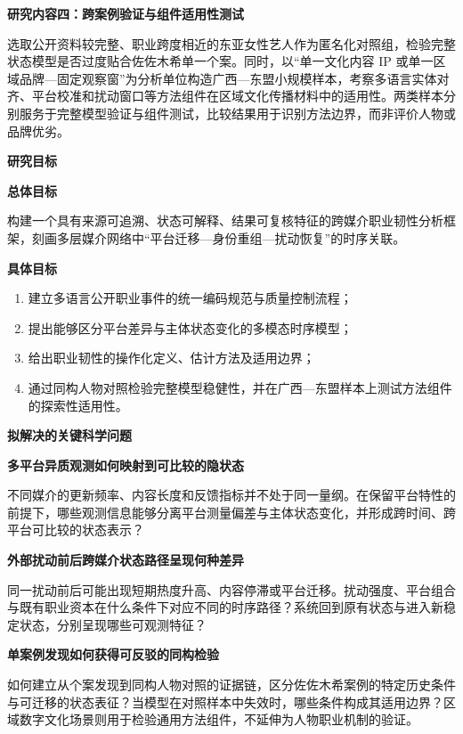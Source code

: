 \noindent\textbf{研究内容四：跨案例验证与组件适用性测试}\par
选取公开资料较完整、职业跨度相近的东亚女性艺人作为匿名化对照组，检验完整状态模型是否过度贴合佐佐木希单一个案。同时，以“单一文化内容 IP 或单一区域品牌—固定观察窗”为分析单位构造广西—东盟小规模样本，考察多语言实体对齐、平台校准和扰动窗口等方法组件在区域文化传播材料中的适用性。两类样本分别服务于完整模型验证与组件测试，比较结果用于识别方法边界，而非评价人物或品牌优劣。

\noindent\textbf{研究目标}\par

\noindent\textbf{总体目标}\par
构建一个具有来源可追溯、状态可解释、结果可复核特征的跨媒介职业韧性分析框架，刻画多层媒介网络中“平台迁移—身份重组—扰动恢复”的时序关联。

\noindent\textbf{具体目标}\par
\begin{enumerate}[label=（\arabic*）,leftmargin=*,itemsep=0pt]
  \item 建立多语言公开职业事件的统一编码规范与质量控制流程；
  \item 提出能够区分平台差异与主体状态变化的多模态时序模型；
  \item 给出职业韧性的操作化定义、估计方法及适用边界；
  \item 通过同构人物对照检验完整模型稳健性，并在广西—东盟样本上测试方法组件的探索性适用性。
\end{enumerate}

\noindent\textbf{拟解决的关键科学问题}\par

\noindent\textbf{多平台异质观测如何映射到可比较的隐状态}\par
不同媒介的更新频率、内容长度和反馈指标并不处于同一量纲。在保留平台特性的前提下，哪些观测信息能够分离平台测量偏差与主体状态变化，并形成跨时间、跨平台可比较的状态表示？

\noindent\textbf{外部扰动前后跨媒介状态路径呈现何种差异}\par
同一扰动前后可能出现短期热度升高、内容停滞或平台迁移。扰动强度、平台组合与既有职业资本在什么条件下对应不同的时序路径？系统回到原有状态与进入新稳定状态，分别呈现哪些可观测特征？

\noindent\textbf{单案例发现如何获得可反驳的同构检验}\par
如何建立从个案发现到同构人物对照的证据链，区分佐佐木希案例的特定历史条件与可迁移的状态表征？当模型在对照样本中失效时，哪些条件构成其适用边界？区域数字文化场景则用于检验通用方法组件，不延伸为人物职业机制的验证。
